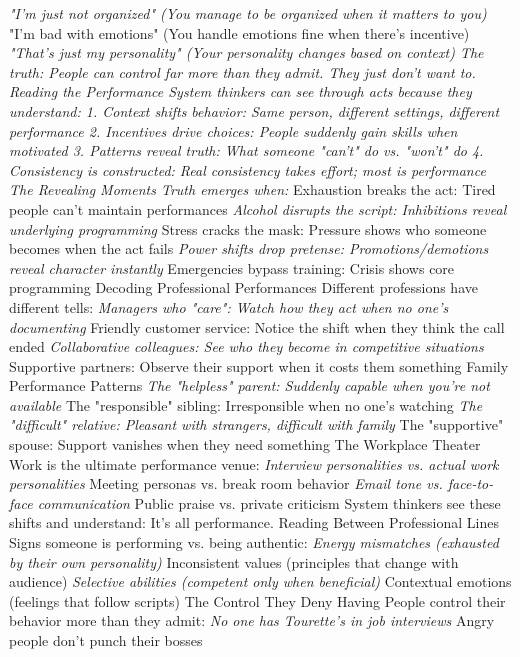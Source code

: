 \documentclass[12pt]{book}
\begin{document}
\textit{ "I'm just not organized" (You manage to be organized when it matters to you)
} "I'm bad with emotions" (You handle emotions fine when there's incentive)
\textit{ "That's just my personality" (Your personality changes based on context)
The truth: People can control far more than they admit. They just don't want to.
Reading the Performance
System thinkers can see through acts because they understand:
1. Context shifts behavior: Same person, different settings, different performance
2. Incentives drive choices: People suddenly gain skills when motivated
3. Patterns reveal truth: What someone "can't" do vs. "won't" do
4. Consistency is constructed: Real consistency takes effort; most is performance
The Revealing Moments
Truth emerges when:
} Exhaustion breaks the act: Tired people can't maintain performances
\textit{ Alcohol disrupts the script: Inhibitions reveal underlying programming
} Stress cracks the mask: Pressure shows who someone becomes when the act fails
\textit{ Power shifts drop pretense: Promotions/demotions reveal character instantly
} Emergencies bypass training: Crisis shows core programming
Decoding Professional Performances
Different professions have different tells:
\textit{ Managers who "care": Watch how they act when no one's documenting
} Friendly customer service: Notice the shift when they think the call ended
\textit{ Collaborative colleagues: See who they become in competitive situations
} Supportive partners: Observe their support when it costs them something
Family Performance Patterns
\textit{ The "helpless" parent: Suddenly capable when you're not available
} The "responsible" sibling: Irresponsible when no one's watching
\textit{ The "difficult" relative: Pleasant with strangers, difficult with family
} The "supportive" spouse: Support vanishes when they need something
The Workplace Theater
Work is the ultimate performance venue:
\textit{ Interview personalities vs. actual work personalities
} Meeting personas vs. break room behavior
\textit{ Email tone vs. face-to-face communication
} Public praise vs. private criticism
System thinkers see these shifts and understand: It's all performance.
Reading Between Professional Lines
Signs someone is performing vs. being authentic:
\textit{ Energy mismatches (exhausted by their own personality)
} Inconsistent values (principles that change with audience)
\textit{ Selective abilities (competent only when beneficial)
} Contextual emotions (feelings that follow scripts)
The Control They Deny Having
People control their behavior more than they admit:
\textit{ No one has Tourette's in job interviews
} Angry people don't punch their bosses
\end{document}
